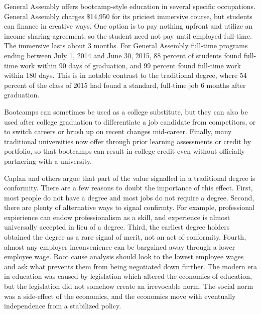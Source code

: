 \documentclass[AER]{./aea-latex-templates/AEA}
\begin{document}
        General Assembly offers bootcamp-style education in several specific occupations. General Assembly
        charges \$14,950 for its priciest immersive course, but students
        can finance in creative ways. One option is to pay nothing upfront and utilize an income sharing
        agreement, so the student need not pay until employed full-time\cite{ga2019}.
        The immersive lasts about 3 months. For General Assembly
        full-time programs ending between July 1, 2014 and June 30, 2015, 88 percent of students found full-time
        work within 90 days of graduation, and 99 percent found full-time work within 180
        days\cite{kirkham_2017}. This is in notable contrast to the traditional degree, where 54 percent of
        the class of 2015 had found a standard, full-time job 6 months after
        graduation\cite{wexler_2016}.
        
        Bootcamps can sometimes be used as a college substitute, but they can also
        be used after college graduation to differentiate a job candidate from
        competitors, or to switch careers or brush up on recent changes
        mid-career. Finally, many traditional universities now offer through prior
        learning assessments or credit by portfolio, so that bootcamps can result
        in college credit even without officially partnering with a university\cite{aceposttraditionallearners}.
        
        Caplan and others argue that part of the value signalled in a traditional degree is conformity. There
        are a few reasons to doubt the importance of this effect. First, most people do not have a degree and most jobs
        do not require a degree. Second, there are plenty of alternative ways to signal confirmty. For example, professional expierience
        can endow professionalism as a skill, and experience is almost universally accepted in lieu of a degree.
        Third, the earliest degree holders obtained the degree as a rare signal of merit, not an act of
        conformity. Fourth, almost any employer inconvenience can be bargained away through a lower employee
        wage. Root cause analysis should look to the lowest employee wages and ask what prevents them from
        being negotiated down further. The modern era in education was caused by legislation which altered the economics of education,
        but the legislation did not somehow create an irrevocable norm. The social norm was a side-effect of the economics, and the economics
        move with eventually independence from a stabilized policy.
        
\end{document}
